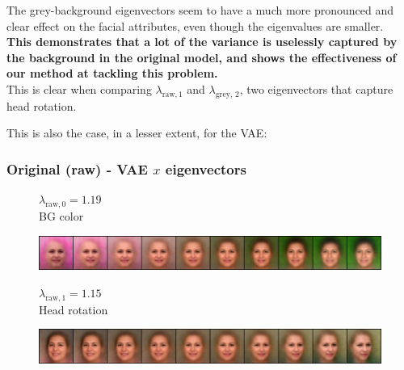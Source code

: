 \documentclass{article}
\begin{document}
The grey-background eigenvectors seem to have a much more pronounced and clear effect on the facial attributes, even though the eigenvalues are smaller. \\
\textbf{This demonstrates that a lot of the variance is uselessly captured by the background in the original model, and shows the effectiveness of our method at tackling this problem.}\\
This is clear when comparing $\lambda_{\text{raw}, 1}$ and $\lambda_{\text{grey, 2}}$, two eigenvectors that capture head rotation.

This is also the case, in a lesser extent, for the VAE:

\subsubsection*{Original (raw) - VAE $x$ eigenvectors}

\begin{figure}[H]
  \centering
  \begin{minipage}{.18\linewidth}
      \centering
      $\lambda_{\text{raw}, 0} = 1.19$ \\
      BG color
  \end{minipage}%
  \hfill
  \begin{minipage}{.81\linewidth}
      \centering
      \includegraphics[width=\linewidth]{eigen/raw_vae_0.png}
  \end{minipage}
\end{figure}

\begin{figure}[H]
  \centering
  \begin{minipage}{.18\linewidth}
      \centering
      $\lambda_{\text{raw}, 1} = 1.15$ \\
      Head rotation
  \end{minipage}%
  \hfill
  \begin{minipage}{.81\linewidth}
      \centering
      \includegraphics[width=\linewidth]{eigen/raw_vae_1.png}
  \end{minipage}
\end{figure}
\end{document}
